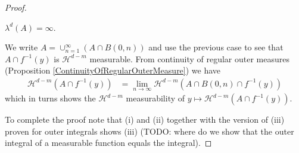 \begin{proof}
\begin{cas} $\lambda^d(A) = \infty$.
\end{cas}
We write $A = \cup_{n=1}^\infty (A \cap B(0,n))$ and use the previous case to see that $A \cap f^{-1}(y)$ is $\mathcal{H}^{d-m}$ measurable.  From continuity of regular outer measures (Proposition \ref{ContinuityOfRegularOuterMeasure}) we have
\begin{align*}
\mathcal{H}^{d-m}(A \cap f^{-1}(y)) &= \lim_{n \to \infty} \mathcal{H}^{d-m}(A \cap B(0,n) \cap f^{-1}(y)) 
\end{align*}
which in turns shows the $\mathcal{H}^{d-m}$ measurability of $y \mapsto \mathcal{H}^{d-m}(A \cap f^{-1}(y))$.

To complete the proof note that (i) and (ii) together with the version of (iii) proven for outer integrals shows (iii) (TODO: where do we show that the outer integral of a measurable function equals the integral).
\end{proof}

